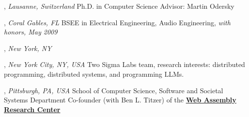 \documentclass[9pt]{article}
\begin{document}



, \emph{Lausanne, Switzerland} \vspace{0.01in} 
\newline Ph.D. in Computer Science
\newline Advisor: Martin Odersky 

\bigskip

, \emph{Coral Gables, FL} \vspace{0.01in}  
\newline\noindent BSEE in Electrical Engineering, Audio Engineering, {\em with honors, May 2009}

\medskip

, \emph{New York, NY} \vspace{0.01in}  

\bigskip

\medskip
{}

, \emph{New York City, NY, USA} \vspace{0.01in} 
\newline{}
\newline Two Sigma Labs team, research interests: distributed programming,\vspace{-0.03in} 
\newline distributed systems, and programming LLMs.
\bigskip

, \emph{Pittsburgh, PA, USA} \vspace{0.01in} 
\newline{}
\newline School of Computer Science, Software and Societal Systems Department\vspace{-0.03in}
\newline Co-founder (with Ben L. Titzer) of the \textbf{\href{https://www.cs.cmu.edu/wrc/}{Web Assembly Research Center}}
\bigskip
\end{document}
